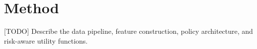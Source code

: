 \section{Method}
\label{sec:method}

[TODO] Describe the data pipeline, feature construction, policy architecture, and risk-aware utility functions.
